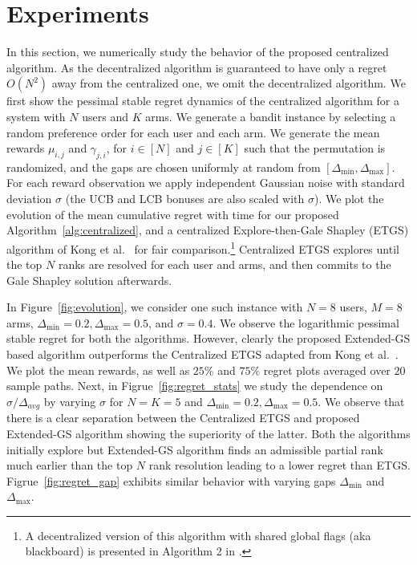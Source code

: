 \documentclass{article}
\begin{document}
\section{Experiments}\label{app:experiment}
In this section, we numerically study the behavior of the proposed centralized algorithm. As the decentralized algorithm is guaranteed to have only a regret $O(N^2)$ away from the centralized one, we omit the decentralized algorithm. We first show the pessimal stable regret dynamics of the centralized algorithm for a system with $N$ users and $K$ arms. We generate a bandit instance by selecting a random preference order for each user and each arm. We generate the mean rewards $\mu_{i,j}$ and $\gamma_{j,i}$, for $i \in [N]$ and $j \in [K]$ such that the permutation is randomized, and the gaps are chosen uniformly at random from  $[\Delta_{\min}, \Delta_{\max}]$. For each reward observation we apply independent Gaussian noise with standard deviation $\sigma$ (the UCB and LCB bonuses are also scaled with $\sigma$). We plot the evolution of the mean cumulative regret with time for our proposed Algorithm~\ref{alg:centralized}, and a centralized Explore-then-Gale Shapley (ETGS) algorithm of Kong et al.~\cite{kong2023playeroptimal} for fair comparison.\footnote{A decentralized version of this algorithm with shared global flags (aka blackboard) is presented in Algorithm 2 in \cite{tejas_2024}.}  Centralized ETGS explores until the top $N$ ranks are resolved for each user and arms, and then commits to the Gale Shapley solution afterwards. %

In Figure~\ref{fig:evolution}, we consider one such instance with  $N=8$ users, $M=8$ arms, $\Delta_{\min} = 0.2, \Delta_{\max} = 0.5$, and $\sigma = 0.4$. We observe the logarithmic pessimal stable regret for both the algorithms. However, clearly the proposed Extended-GS based algorithm outperforms the Centralized ETGS adapted from Kong et al.~\cite{kong2023playeroptimal}. We plot the mean rewards, as well as $25\%$ and $75\%$ regret plots averaged over $20$ sample paths. Next, in Figrue~\ref{fig:regret_stats} we study the dependence on $\sigma / \Delta_{avg}$ by varying $\sigma$ for $N=K=5$ and $\Delta_{\min} = 0.2, \Delta_{\max} = 0.5$.  We observe that there is a clear separation between the Centralized ETGS and proposed Extended-GS algorithm showing the superiority of the latter. Both the algorithms initially explore but Extended-GS algorithm finds an admissible partial rank much earlier than the top $N$ rank resolution leading to a lower regret than ETGS. Figrue~\ref{fig:regret_gap} exhibits similar behavior with varying gaps $\Delta_{\min}$ and $\Delta_{\max}$.
\end{document}
